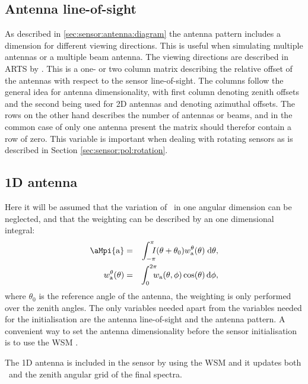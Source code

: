 \subsection{Antenna line-of-sight}
As described in \ref{sec:sensor:antenna:diagram} the antenna pattern
includes a dimension for different viewing directions. This is useful
when simulating multiple antennas or a multiple beam antenna. The
viewing directions are described in ARTS by
. This is a one- or two column matrix
describing the relative offset of the antennas with respect to the
sensor line-of-sight. The columns follow the general idea for antenna
dimensionality, with first column denoting zenith offsets and the
second being used for 2D antennas and denoting azimuthal offsets. The
rows on the other hand describes the number of antennas or beams, and
in the common case of only one antenna present the matrix should
therefor contain a row of zero.  This variable is important when
dealing with rotating sensors as is described in
Section \ref{sec:sensor:pol:rotation}.

\subsection{1D antenna}
Here it will be assumed that the variation of \Mpi\ in one angular
dimension can be neglected, and that the weighting can be described by
an one dimensional integral:
\begin{eqnarray}
\label{eq:sensor:antenna:1D}
  \aMpi{\mathrm{a}} &=& \int_{-\pi}^\pi\!\!\!\!I(\theta+\theta_0) 
  w_\mathrm{a}^\theta(\theta)\;\mathrm{d}\theta,\\
  w_\mathrm{a}^\theta(\theta) &=& \int_0^{2\pi}\!\!\!\!
  w_\mathrm{a}(\theta,\phi)\cos(\theta)\,\mathrm{d}\phi,
\end{eqnarray}
where $\theta_0$ is the reference angle of the antenna, the weighting
is only performed over the zenith angles. The only variables needed
apart from the variables needed for the initialisation are the antenna
line-of-sight and the antenna pattern. A convenient way to set the
antenna dimensionality before the sensor initialisation is to use the
WSM .

The 1D antenna is included in the sensor by using the WSM
 and it updates both \SnsMtr\ and
the zenith angular grid of the final spectra.


